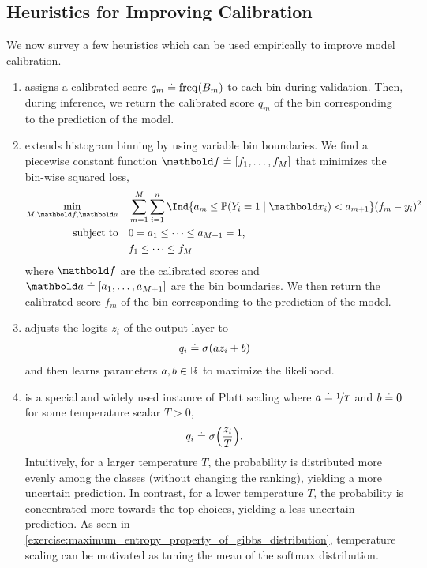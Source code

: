 \subsection{Heuristics for Improving Calibration}\label{sec:bdl:calibration:improving}

We now survey a few heuristics which can be used empirically to improve model calibration. \begin{enumerate}
  \item {} assigns a calibrated score $q_m \overset{.}{=} \mathrm{freq}(B_m)$ to each bin during validation.
  Then, during inference, we return the calibrated score $q_m$ of the bin corresponding to the prediction of the model.

  \item {} extends histogram binning by using variable bin boundaries.
  We find a piecewise constant function $\vf \defeq [f_1, \dots, f_M]$ that minimizes the bin-wise squared loss, \begin{subequations}\begin{align}
    \min_{M, \vf, \va} \quad&\sum_{m=1}^M \sum_{i=1}^n \Ind{a_m \leq \Pr{Y_i = 1 \mid \vx_i} < a_{m+1}} (f_m - y_i)^2 \\
    \text{subject to} \quad&0 = a_1 \leq \cdots \leq a_{M+1} = 1, \\
    &f_1 \leq \cdots \leq f_M
  \end{align}\end{subequations} where $\vf$ are the calibrated scores and $\va \defeq [a_1, \dots, a_{M+1}]$ are the bin boundaries.
  We then return the calibrated score $f_m$ of the bin corresponding to the prediction of the model.

  \item {} adjusts the logits $z_i$ of the output layer to \begin{align}
    q_i \overset{.}{=} \sigma(a z_i + b)
  \end{align} and then learns parameters $a, b \in \mathbb{R}$ to maximize the likelihood.

  \item {} is a special and widely used instance of Platt scaling where $a \overset{.}{=} \nicefrac{1}{T}$ and $b \overset{.}{=} 0$ for some temperature scalar ${T > 0}$, \begin{align}
    q_i \defeq \sigma\parentheses*{\frac{z_i}{T}}.
  \end{align}
  Intuitively, for a larger temperature $T$, the probability is distributed more evenly among the classes (without changing the ranking), yielding a more uncertain prediction.
  In contrast, for a lower temperature $T$, the probability is concentrated more towards the top choices, yielding a less uncertain prediction.
  As seen in \cref{exercise:maximum_entropy_property_of_gibbs_distribution}, temperature scaling can be motivated as tuning the mean of the softmax distribution.
\end{enumerate}
\vspace{\baselineskip}

